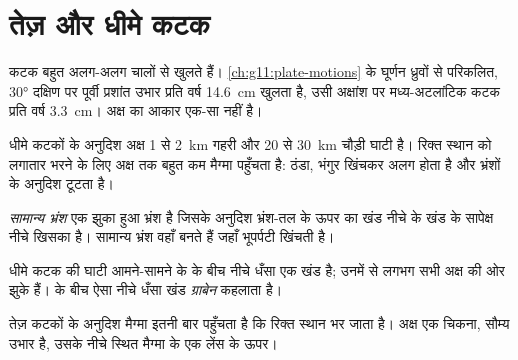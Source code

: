 \section{तेज़ और धीमे कटक}

कटक बहुत अलग-अलग चालों से खुलते हैं।
\cref{ch:g11:plate-motions} के घूर्णन ध्रुवों से परिकलित, \ang{30} दक्षिण पर पूर्वी प्रशांत उभार
प्रति वर्ष \qty{14.6}{cm} खुलता है, उसी अक्षांश पर मध्य-अटलांटिक कटक
प्रति वर्ष \qty{3.3}{cm}। अक्ष का आकार एक-सा नहीं है।

धीमे कटकों के अनुदिश अक्ष 1 से \qty{2}{km} गहरी और 20 से
\qty{30}{km} चौड़ी घाटी है। रिक्त स्थान को लगातार भरने के लिए अक्ष तक बहुत कम मैग्मा
पहुँचता है: ठंडा, भंगुर  खिंचकर अलग होता है और
भ्रंशों के अनुदिश टूटता है।

\begin{definition}[सामान्य भ्रंश]\label{def:g11:ocean-ridges:normal-fault}
\emph{सामान्य भ्रंश} एक झुका हुआ भ्रंश है जिसके अनुदिश
भ्रंश-तल के ऊपर का खंड नीचे के खंड के सापेक्ष नीचे खिसका है।
सामान्य भ्रंश वहाँ बनते हैं जहाँ भूपर्पटी खिंचती है।
\end{definition}

धीमे कटक की घाटी आमने-सामने के  के बीच नीचे धँसा एक खंड है;
उनमें से लगभग सभी अक्ष की ओर झुके हैं।  के बीच ऐसा नीचे धँसा
खंड \emph{ग्राबेन} कहलाता है।

तेज़ कटकों के अनुदिश मैग्मा इतनी बार पहुँचता है कि रिक्त स्थान भर जाता है। अक्ष एक
चिकना, सौम्य उभार है, उसके नीचे स्थित मैग्मा के एक लेंस के ऊपर।

